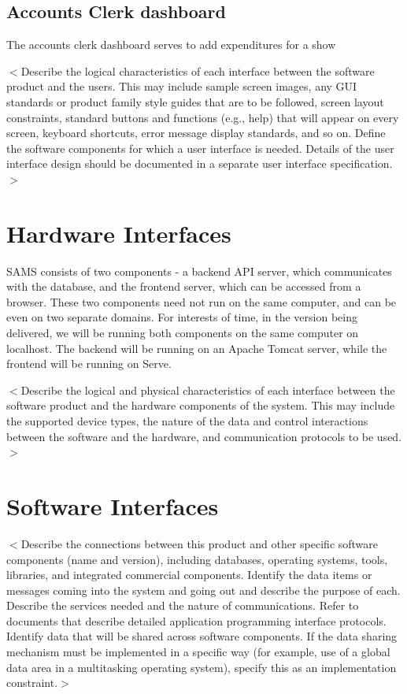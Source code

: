 \documentclass{scrreprt}
\begin{document}
\subsection{Accounts Clerk dashboard}
The accounts clerk dashboard serves to add expenditures for a show

$<$Describe the logical characteristics of each interface between the software 
product and the users. This may include sample screen images, any GUI standards 
or product family style guides that are to be followed, screen layout 
constraints, standard buttons and functions (e.g., help) that will appear on 
every screen, keyboard shortcuts, error message display standards, and so on.  
Define the software components for which a user interface is needed. Details of 
the user interface design should be documented in a separate user interface 
specification.$>$

\section{Hardware Interfaces}
SAMS consists of two components - a backend API server, which communicates with the database, and the frontend server, which can be accessed from a browser. These two components need not run on the same computer, and can be even on two separate domains. For interests of time, in the version being delivered, we will be running both components on the same computer on localhost. The backend will be running on an Apache Tomcat server, while the frontend will be running on Serve.

$<$Describe the logical and physical characteristics of each interface between 
the software product and the hardware components of the system. This may include 
the supported device types, the nature of the data and control interactions 
between the software and the hardware, and communication protocols to be 
used.$>$

\section{Software Interfaces}
$<$Describe the connections between this product and other specific software 
components (name and version), including databases, operating systems, tools, 
libraries, and integrated commercial components. Identify the data items or 
messages coming into the system and going out and describe the purpose of each.  
Describe the services needed and the nature of communications. Refer to 
documents that describe detailed application programming interface protocols.  
Identify data that will be shared across software components. If the data 
sharing mechanism must be implemented in a specific way (for example, use of a 
global data area in a multitasking operating system), specify this as an 
implementation constraint.$>$
\end{document}
